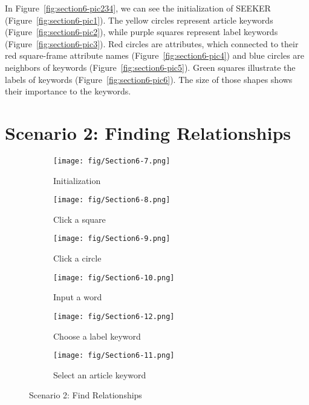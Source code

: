 \vspace{-10pt}
In Figure~\ref{fig:section6-pic234}, we can see the initialization of SEEKER (Figure~\ref{fig:section6-pic1}). The yellow circles represent article keywords (Figure~\ref{fig:section6-pic2}), while purple squares represent label keywords (Figure~\ref{fig:section6-pic3}). Red circles are attributes, which connected to their red square-frame attribute names (Figure~\ref{fig:section6-pic4}) and blue circles are neighbors of keywords (Figure~\ref{fig:section6-pic5}). Green squares illustrate the labels of keywords (Figure~\ref{fig:section6-pic6}). The size of those shapes shows their importance to the keywords.

\section{Scenario 2: Finding Relationships}
\begin{figure*}[!htb]
	\centering
	\begin{subfigure}{0.31\textwidth}
		\texttt{[image: fig/Section6-7.png]}
		\caption{Initialization} 
		\label{fig:section6-pic7}
	\end{subfigure}
	\hspace*{\fill} %
	\begin{subfigure}{0.31\textwidth}
		\texttt{[image: fig/Section6-8.png]}
		\caption{Click a square} \label{fig:section6-pic8}
	\end{subfigure}
	\hspace*{\fill} %
	\begin{subfigure}{0.31\textwidth}
		\texttt{[image: fig/Section6-9.png]}
		\caption{Click a circle} \label{fig:section6-pic9}
	\end{subfigure}
	\vspace{10pt}
	\begin{subfigure}{0.31\textwidth}
		\texttt{[image: fig/Section6-10.png]}
		\caption{Input a word} 
		\label{fig:section6-pic10}
	\end{subfigure}
	\hspace*{\fill} %
	\begin{subfigure}{0.31\textwidth}
		\texttt{[image: fig/Section6-12.png]}
		\caption{Choose a label keyword} \label{fig:section6-pic11}
	\end{subfigure}
	\hspace*{\fill} %
	\begin{subfigure}{0.31\textwidth}
		\texttt{[image: fig/Section6-11.png]}
		\caption{Select an article keyword} \label{fig:section6-pic12}
	\end{subfigure}
	\vspace{-10pt}
	\caption{Scenario 2: Find Relationships} \label{fig:section6-pic789}
	\vspace{-20pt}
\end{figure*}
